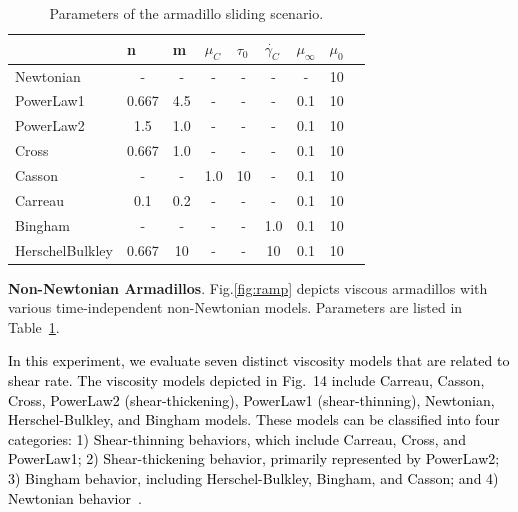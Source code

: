 \documentclass[10pt,journal,compsoc]{IEEEtran}
\newcommand{\revised}[1]{{\textcolor{black}{#1}}}
\begin{document}
\begin{table}[]
	\caption{Parameters of the armadillo sliding scenario.}
	\centering
	\begin{tabular}{lcccccccc}
		\toprule
		                                     &
		\multicolumn{1}{l}{n}                &
		\multicolumn{1}{l}{m}                &
		\multicolumn{1}{l}{$\mu_C$}          &
		\multicolumn{1}{l}{$\tau_0$}         &
		\multicolumn{1}{l}{$\dot{\gamma_C}$} &
		\multicolumn{1}{l}{$\mu_{\infty}$}   &
		\multicolumn{1}{l}{$\mu_{0}$}                                                  \\
		\midrule
		Newtonian                            & -     & -   & -   & -  & -   & -   & 10 \\
		PowerLaw1                            & 0.667 & 4.5 & -   & -  & -   & 0.1 & 10 \\
		PowerLaw2                            & 1.5   & 1.0 & -   & -  & -   & 0.1 & 10 \\
		Cross                                & 0.667 & 1.0 & -   & -  & -   & 0.1 & 10 \\
		Casson                               & -     & -   & 1.0 & 10 & -   & 0.1 & 10 \\
		Carreau                              & 0.1   & 0.2 & -   & -  & -   & 0.1 & 10 \\
		Bingham                              & -     & -   & -   & -  & 1.0 & 0.1 & 10 \\
		HerschelBulkley                      & 0.667 & 10  & -   & -  & 10  & 0.1 & 10 \\
		\bottomrule
	\end{tabular}\label{tab:armadillo-params}
\end{table}



\textbf{Non-Newtonian Armadillos}.
Fig.\ref{fig:ramp} depicts viscous armadillos with various time-independent non-Newtonian models. Parameters are listed in Table~\ref{tab:armadillo-params}.

\revised{In this experiment, we evaluate seven distinct viscosity models that are related to shear rate. The viscosity models depicted in Fig.~14 include Carreau, Casson, Cross, PowerLaw2 (shear-thickening), PowerLaw1 (shear-thinning), Newtonian, Herschel-Bulkley, and Bingham models. These models can be classified into four categories: 1) Shear-thinning behaviors, which include Carreau, Cross, and PowerLaw1; 2) Shear-thickening behavior, primarily represented by PowerLaw2; 3) Bingham behavior, including Herschel-Bulkley, Bingham, and Casson; and 4) Newtonian behavior~\cite{Chhabra2010,Phan2017}}.
\end{document}
